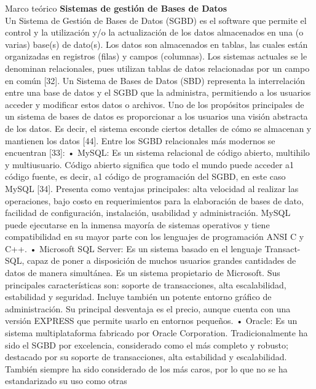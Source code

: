 \begin{thesischapter}{1} {Marco teórico}
    \vspace{10pt}
    \textbf{Sistemas de gestión de Bases de Datos}\\
    Un Sistema de Gestión de Bases de Datos (SGBD) es el software que permite el control y la
    utilización y/o la actualización de los datos almacenados en una (o varias) base(s) de dato(s).
    Los datos son almacenados en tablas, las cuales están organizadas en registros (filas) y
    campos (columnas). Los sistemas actuales se le denominan relacionales, pues utilizan tablas
    de datos relacionadas por un campo en común [32]. Un Sistema de Bases de Datos (SBD)
    representa la interrelación entre una base de datos y el SGBD que la administra, permitiendo
    a los usuarios acceder y modificar estos datos o archivos. Uno de los propósitos principales
    de un sistema de bases de datos es proporcionar a los usuarios una visión abstracta de los
    datos. Es decir, el sistema esconde ciertos detalles de cómo se almacenan y mantienen los
    datos [44].
    Entre los SGBD relacionales más modernos se encuentran [33]:
    • MySQL: Es un sistema relacional de código abierto, multihilo y multiusuario. Código
    abierto significa que todo el mundo puede acceder a1 código fuente, es decir, a1 código de
    programación del SGBD, en este caso MySQL [34]. Presenta como ventajas principales: alta
    velocidad al realizar las operaciones, bajo costo en requerimientos para la elaboración de
    bases de dato, facilidad de configuración, instalación, usabilidad y administración. MySQL
    puede ejecutarse en la inmensa mayoría de sistemas operativos y tiene compatibilidad en su
    mayor parte con los lenguajes de programación ANSI C y C++.
    • Microsoft SQL Server: Es un sistema basado en el lenguaje Transact-SQL, capaz de poner
    a disposición de muchos usuarios grandes cantidades de datos de manera simultánea. Es un
    sistema propietario de Microsoft. Sus principales características son: soporte de
    transacciones, alta escalabilidad, estabilidad y seguridad. Incluye también un potente entorno
    gráfico de administración. Su principal desventaja es el precio, aunque cuenta con una
    versión EXPRESS que permite usarlo en entornos pequeños.
    • Oracle: Es un sistema multiplataforma fabricado por Oracle Corporation. Tradicionalmente
    ha sido el SGBD por excelencia, considerado como el más completo y robusto; destacado
    por su soporte de transacciones, alta estabilidad y escalabilidad. También siempre ha sido
    considerado de los más caros, por lo que no se ha estandarizado su uso como otras

\end{thesischapter}
